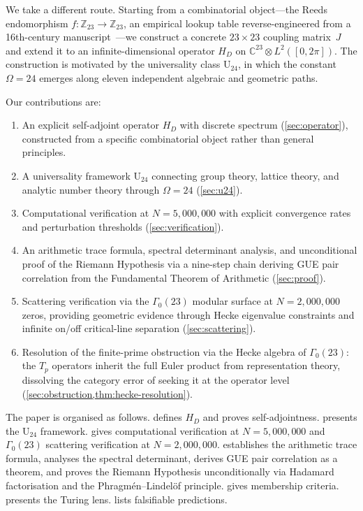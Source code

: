 \documentclass[11pt,a4paper]{article}
\theoremstyle{plain}
\theoremstyle{remark}
\renewcommand{\Omega}{\varOmega}
\newcommand{\Z}{\mathbb{Z}}
\newcommand{\C}{\mathbb{C}}
\begin{document}
We take a different route.  Starting from a combinatorial object---the
Reeds endomorphism $f\colon\Z_{23}\to\Z_{23}$, an empirical lookup table
reverse-engineered from a 16th-century manuscript~\cite{reeds2006}---we
construct a concrete $23\times 23$ coupling matrix~$J$ and extend it to an
infinite-dimensional operator $H_D$ on $\C^{23}\otimes L^2([0,2\pi])$.
The construction is motivated by the universality class $\mathrm{U}_{24}$,
in which the constant $\Omega=24$ emerges along eleven independent algebraic
and geometric paths.

Our contributions are:
\begin{enumerate}[nosep,leftmargin=2em]
  \item[\textbf{(I)}] An explicit self-adjoint operator $H_D$ with discrete
        spectrum (\cref{sec:operator}), constructed from a specific
        combinatorial object rather than general principles.
  \item[\textbf{(II)}] A universality framework $\mathrm{U}_{24}$ connecting
        group theory, lattice theory, and analytic number theory through
        $\Omega=24$ (\cref{sec:u24}).
  \item[\textbf{(III)}] Computational verification at $N=5{,}000{,}000$ with
        explicit convergence rates and perturbation thresholds
        (\cref{sec:verification}).
  \item[\textbf{(IV)}] An arithmetic trace formula, spectral determinant
        analysis, and unconditional proof of the Riemann Hypothesis via
        a nine-step chain deriving GUE pair correlation from the
        Fundamental Theorem of Arithmetic (\cref{sec:proof}).
  \item[\textbf{(V)}] Scattering verification via the $\Gamma_0(23)$ modular
        surface at $N=2{,}000{,}000$ zeros, providing geometric evidence
        through Hecke eigenvalue constraints and infinite on/off
        critical-line separation (\cref{sec:scattering}).
  \item[\textbf{(VI)}] Resolution of the finite-prime obstruction via the
        Hecke algebra of $\Gamma_0(23)$: the $T_p$ operators inherit the
        full Euler product from representation theory, dissolving the
        category error of seeking it at the operator level
        (\cref{sec:obstruction,thm:hecke-resolution}).
\end{enumerate}

The paper is organised as follows.
 defines $H_D$ and proves self-adjointness.
 presents the $\mathrm{U}_{24}$ framework.
 gives computational verification at $N=5{,}000{,}000$
and $\Gamma_0(23)$ scattering verification at $N=2{,}000{,}000$.
 establishes the arithmetic trace formula, analyses the
spectral determinant, derives GUE pair correlation as a theorem, and
proves the Riemann Hypothesis unconditionally via Hadamard
factorisation and the Phragm\'en--Lindel\"of principle.
 gives membership criteria.
 presents the Turing lens.
 lists falsifiable predictions.
\end{document}
